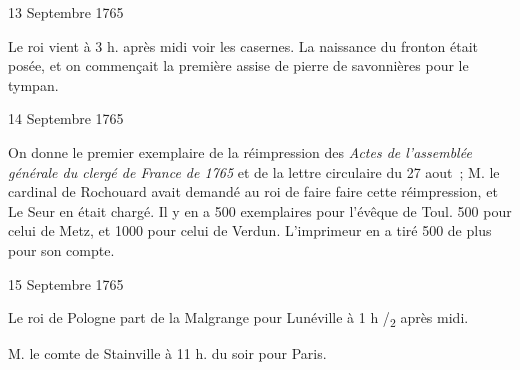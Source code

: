                      \begin{diary}{13 Septembre 1765}{}
                        
                        
                           Le roi vient à 3 h. après midi voir les
                              casernes. La naissance du fronton était
                           posée, et on commençait la première
                           assise de pierre de savonnières pour le
                           tympan. \bigskip
        
        
                     \end{diary}

                     \begin{diary}{14 Septembre 1765}{}
                        
                         On donne le premier exemplaire de la
                           réimpression des \emph{Actes de l'assemblée
                                 générale
                                 du clergé de France de 1765} et de la lettre
                           circulaire du 27 aout ; M. le cardinal
                              de Rochouard avait demandé au roi de
                           faire faire cette réimpression, et Le
                              Seur
                           en était chargé. Il y en a 500 exemplaires
                           pour l'évêque de Toul. 500
                           pour celui de Metz, et 1000 pour celui
                              de Verdun.
                           L'imprimeur en a tiré 500 de plus
                           pour son compte. \bigskip
        
        
                     \end{diary}

                     \begin{diary}{15 Septembre 1765}{}
                        
                        
                           Le roi de Pologne part de la
                              Malgrange
                           pour Lunéville à 1 h /\textsubscript{2} après midi. \bigskip
        
        
                        
                           M. le comte de Stainville à 11 h.
                           du
                           soir pour Paris. \bigskip
        
        
                     \end{diary}

